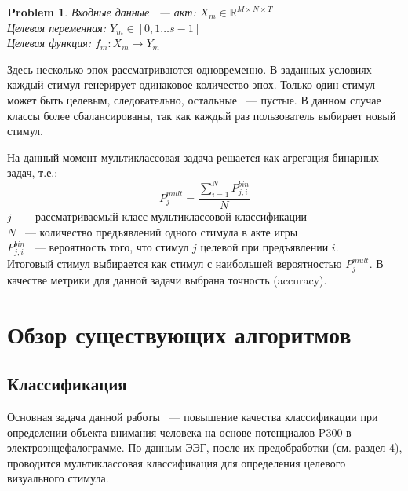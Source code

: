 \documentclass[12pt]{article}
\newcommand{\R}{\mathbb{R}}
\newtheorem{problem}{Problem}
\begin{document}
\begin{enumerate}
\begin{problem}
			Входные данные ~--- акт: $X_m \in \R^{M \times N \times T}$\\
			Целевая переменная: $ Y_m \in [0, 1 \dots s-1] $ \\
			Целевая функция: $ f_m: X_m \to Y_m$
		\end{problem}
		
		Здесь несколько эпох рассматриваются одновременно. В заданных условиях каждый стимул генерирует одинаковое количество эпох. Только один стимул может быть целевым, следовательно, остальные ~---  пустые. В данном случае классы более сбалансированы, так как каждый раз пользователь выбирает новый стимул.
		
		На данный момент мультиклассовая задача решается как агрегация бинарных задач, т.е.:
		$$P^{mult}_j = \frac{\sum_{i=1}^NP^{bin}_{j,i}}{N}$$
		$j$ ~--- рассматриваемый класс мультиклассовой классификации\\
		$N$ ~--- количество предъявлений одного стимула в акте игры\\
		$P_{j, i}^{bin}$ ~--- вероятность того, что стимул $j$ целевой при предъявлении $i$.\\
		
		Итоговый стимул выбирается как стимул с наибольшей вероятностью $P^{mult}_j$. В качестве метрики для данной задачи выбрана точность (accuracy).
		
	\end{enumerate}
	\newpage
	\section{Обзор существующих алгоритмов }
	\subsection{Классификация}
	Основная задача данной работы ~--- повышение качества классификации при определении объекта внимания человека на основе потенциалов P300 в электроэнцефалограмме. 
	По данным ЭЭГ, после их предобработки (см. раздел 4), проводится мультиклассовая классификация для определения целевого визуального стимула. 
	
\end{document}

